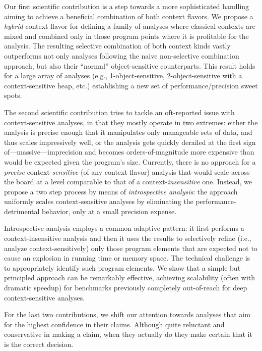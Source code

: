  Our first scientific contribution is a step towards a more sophisticated handling aiming to achieve a beneficial combination of both context flavors. We propose a \emph{hybrid} context flavor for defining a family of analyses where classical contexts are mixed and combined only in those program points where it is profitable for the analysis. The resulting selective combination of both context kinds vastly outperforms not only analyses following the naive non-selective combination approach, but also their ``normal'' object-sensitive counterparts. This result holds for a large array of analyses (e.g., 1-object-sensitive, 2-object-sensitive with a context-sensitive heap, etc.) establishing a new set of performance/precision sweet spots.

 The second scientific contribution tries to tackle an oft-reported issue with context-sensitive analyses, in that they mostly operate in two extremes: either the analysis is precise enough that it manipulates only manageable sets of data, and thus scales impressively well, or the analysis gets quickly derailed at the first sign of---massive---imprecision and becomes orders-of-magnitude more expensive than would be expected given the program's size. Currently, there is no approach for a \emph{precise} context-\emph{sensitive} (of any context flavor) analysis that would scale across the board at a level comparable to that of a context-\emph{insensitive} one. Instead, we propose a two step process by means of \emph{introspective analysis}: the approach uniformly scales context-sensitive analyses by eliminating the performance-detrimental behavior, only at a small precision expense.

Introspective analysis employs a common adaptive pattern: it first performs a context-insensitive analysis and then it uses the results to selectively refine (i.e., analyze context-sensitively) only those program elements that are expected not to cause an explosion in running time or memory space. The technical challenge is to appropriately identify such program elements. We show that a simple but principled approach can be remarkably effective, achieving scalability (often with dramatic speedup) for benchmarks previously completely out-of-reach for deep context-sensitive analyses.

For the last two contributions, we shift our attention towards analyses that aim for the highest confidence in their claims. Although quite reluctant and conservative in making a claim, when they actually do they make certain that it is the correct decision.

